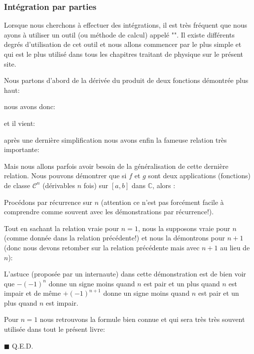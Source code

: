 	\pagebreak
	\subsubsection{Intégration par parties}\label{integration by parts}
	Lorsque nous cherchons à effectuer des intégrations, il est très fréquent que nous ayons à utiliser un outil (ou méthode de calcul) appelé "". Il existe différents degrés d'utilisation de cet outil et nous allons commencer par le plus simple et qui est le plus utilisé dans tous les chapitres traitant de physique sur le présent site.

	Nous partons d'abord de la dérivée du produit de deux fonctions démontrée plus haut:
	
	nous avons donc:
	
	et il vient:
	
	après une dernière simplification nous avons enfin la fameuse relation très importante:
	
	Mais nous allons parfois avoir besoin de la généralisation de cette dernière relation. Nous pouvons démontrer que si $f$ et $g$ sont deux applications (fonctions) de classe $\mathcal{C}^n$ (dérivables $n$ fois) sur $[a, b]$ dans $\mathbb{C}$, alors :
	
	\begin{dem}
	Procédons par récurrence sur $n$ (attention ce n'est pas forcément facile à comprendre comme souvent avec les démonstrations par récurrence!).
	
	Tout en sachant la relation vraie pour $n = 1$, nous la supposons vraie pour $n$ (comme donnée dans la relation précédente!) et nous la démontrons pour $n + 1$ (donc nous devons retomber sur la relation précédente mais avec $n + 1$ au lieu de $n$):
	
	\begin{tcolorbox}[title=Remarque,colframe=black,arc=10pt]
	L'astuce (proposée par un internaute) dans cette démonstration est de bien voir que $-(-1)^n$ donne un signe moins quand $n$ est pair et un plus quand $n$ est impair et de même $+(-1)^{n+1}$ donne un signe moins quand $n$ est pair et un plus quand $n$ est impair.
	\end{tcolorbox}
	Pour $n = 1$ nous retrouvons la formule bien connue et qui sera très très souvent utilisée dans tout le présent livre:
	
	\begin{flushright}
		$\blacksquare$  Q.E.D.
	\end{flushright}
	\end{dem}

